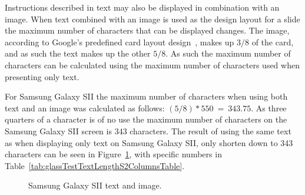 Instructions described in text may also be displayed in combination with an image. When text combined with an image is used as the design layout for a slide the maximum number of characters that can be displayed changes. The image, according to Google's predefined card layout design~\cite{glassDesignStyle}, makes up \(3/8\) of the card, and as such the text makes up the other \(5/8\). As such the maximum number of characters can be calculated using the maximum number of characters used when presenting only text.

For Samsung Galaxy SII the maximum number of characters when using both text and an image was calculated as follows: \((5/8)*550~=~343.75\). As three quarters of a character is of no use the maximum number of characters on the Samsung Galaxy SII screen is 343 characters. The result of using the same text as when displaying only text on Samsung Galaxy SII, only shorten down to 343 characters can be seen in Figure~\ref{glassTestTextLengthS2Columns}, with specific numbers in Table~\ref{tab:glassTestTextLengthS2ColumnsTable}.

	\begin{figure}[H]%
		\centering
   		 \qquad
   		 \qquad
   		 \qquad
		\caption{Samsung Galaxy SII text and image.}
		\label{glassTestTextLengthS2Columns}
	\end{figure}

